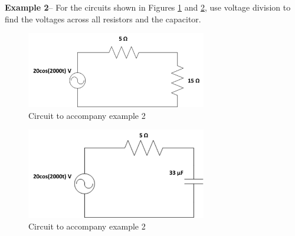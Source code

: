 \documentclass{handout}
\begin{document}
\textbf{Example 2}-- For the circuits shown in Figures \ref{fig: Example2a} and \ref{fig: Example2b}, use voltage division to find the voltages across all resistors and the capacitor.

\begin{figure} [h!]
\centering
\includegraphics[width=0.7\textwidth]{Example2a.jpg}
\caption{Circuit to accompany example 2}
\label{fig: Example2a}
\end{figure}
\begin{figure} [h!]
\centering
\includegraphics[width=0.7\textwidth]{Example2b.jpg}
\caption{Circuit to accompany example 2}
\label{fig: Example2b}
\end{figure}
\end{document}
